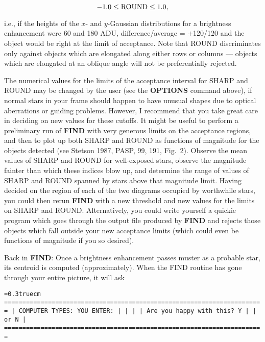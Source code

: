 $$-1.0 \leq \hbox{\rm ROUND} \leq 1.0,$$

\noindent i.e., if the heights of the $x$- and $y$-Gaussian
distributions for a brightness enhancement were 60 and 180 ADU,
difference/average = $\pm$120/120 and the object would be right at the
limit of acceptance.  Note that ROUND discriminates only against
objects which are elongated along either rows or columns --- objects
which are elongated at an oblique angle will not be preferentially
rejected.

The numerical values for the limits of the acceptance interval for
SHARP and ROUND may be changed by the user (see the {\bf OPTIONS}
command above),  if normal stars in your frame should happen to have
unusual shapes due to optical aberrations or guiding problems.
However, I recommend that you take great care in deciding on new values
for these cutoffs.  It might be useful to perform a preliminary run of
{\bf FIND} with very generous limits on the acceptance regions, and
then to plot up both SHARP and ROUND as functions of magnitude for the
objects detected (see Stetson 1987, PASP, 99, 191, Fig.~2).  Observe
the mean values of SHARP and ROUND for well-exposed stars, observe the
magnitude fainter than which these indices blow up, and determine the
range of values of SHARP and ROUND spanned by stars above that
magnitude limit.  Having decided on the region of each of the two
diagrams occupied by worthwhile stars, you could then rerun {\bf FIND}
with a new threshold and new values for the limits on SHARP and ROUND.
Alternatively, you could write yourself a quickie program which goes
through the output file produced by {\bf FIND} and rejects those
objects which fall outside your new acceptance limits (which could even
be functions of magnitude if you so desired).

Back in {\bf FIND}:  Once a brightness enhancement passes muster
as a probable star, its centroid is computed (approximately).  When the
FIND routine has gone through your entire picture, it will ask

\bigskip
{\noindent\obeylines\obeyspaces\frenchspacing\tt\baselineskip=0.3truecm
=======================================================================
| COMPUTER TYPES:                                      YOU ENTER:     |
|                                                                     |
| Are you happy with this?                             Y              |
|                                                   or N              |
=======================================================================
}
\bigskip

